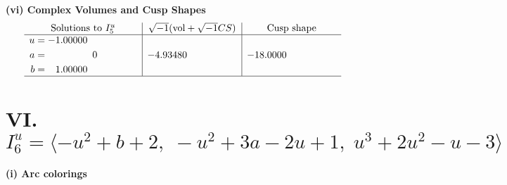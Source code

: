 \documentclass[1p]{elsarticle_modified}
\theoremstyle{definition}
\newcommand{\I}{\sqrt{-1}}
\begin{document}
\newpage\flushleft \textbf{(vi) Complex Volumes and Cusp Shapes}
$$\begin{array}{c|c|c}  
\text{Solutions to }I^u_{5}& \I (\text{vol} + \sqrt{-1}CS) & \text{Cusp shape}\\
 \hline 
\begin{aligned}
u &= -1.00000\phantom{ +0.000000I} \\
a &= \phantom{-0.000000 } 0 \\
b &= \phantom{-}1.00000\phantom{ +0.000000I}\end{aligned}
 & -4.93480\phantom{ +0.000000I} & -18.0000\phantom{ +0.000000I}\\
 \hline 
 \end{array}$$\newpage\newpage\renewcommand{\arraystretch}{1}
\centering \section*{VI. $I^u_{6}= \langle - u^2+b+2,\;- u^2+3 a-2 u+1,\;u^3+2 u^2- u-3 \rangle$}
\flushleft \textbf{(i) Arc colorings}\\
\end{document}
